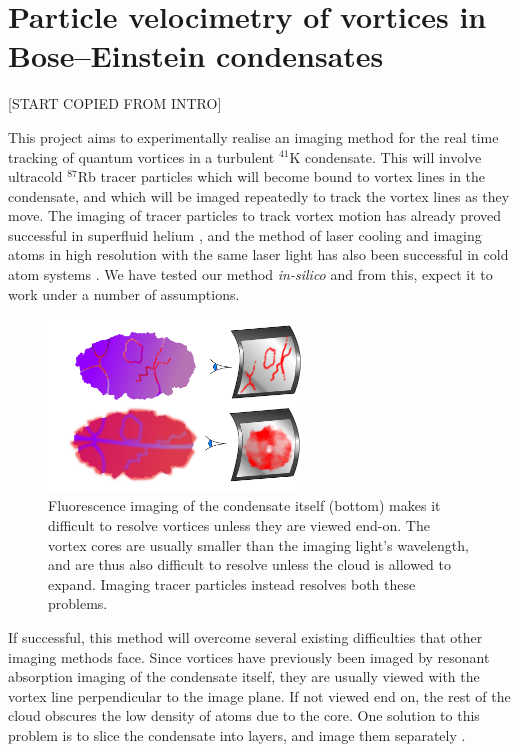 
\chapter{Particle velocimetry of vortices in Bose–Einstein condensates}

[START COPIED FROM INTRO]

This project aims to experimentally realise an imaging method for the real time tracking of quantum vortices in a turbulent $^{41}$K condensate. This will involve ultracold $^{87}$Rb tracer particles which will become bound to vortex lines in the condensate, and which will be imaged repeatedly to track the vortex lines as they move. The imaging of tracer particles to track vortex motion has already proved successful in superfluid helium \cite{bewley_generation_2009, bewley_superfluid_2006, packard_vortex_1982}, and the method of laser cooling and imaging atoms in high resolution with the same laser light has also been successful in cold atom systems \cite{bakr_quantum_2009}. We have tested our method \textit{in-silico} \cite{billington_particle_2010} and from this, expect it to work under a number of assumptions.

\begin{figure}
\begin{center}
\includegraphics[width=0.6\textwidth]{figures/unsorted/side-on.pdf}
\caption{\label{fig:side-on}Fluorescence imaging of the condensate itself (bottom) makes it difficult to resolve vortices unless they are viewed end-on. The vortex cores are usually smaller than the imaging light's wavelength, and are thus also difficult to resolve unless the cloud is allowed to expand. Imaging tracer particles instead resolves both these problems.}
\end{center}
\end{figure}

If successful, this method will overcome several existing difficulties that other imaging methods face. Since vortices have previously been imaged by resonant absorption imaging of the condensate itself, they are usually viewed with the vortex line perpendicular to the image plane. If not viewed end on, the rest of the cloud obscures the low density of atoms due to the core. One solution to this problem is to slice the condensate into layers, and image them separately \cite{anderson_watching_2001}.

